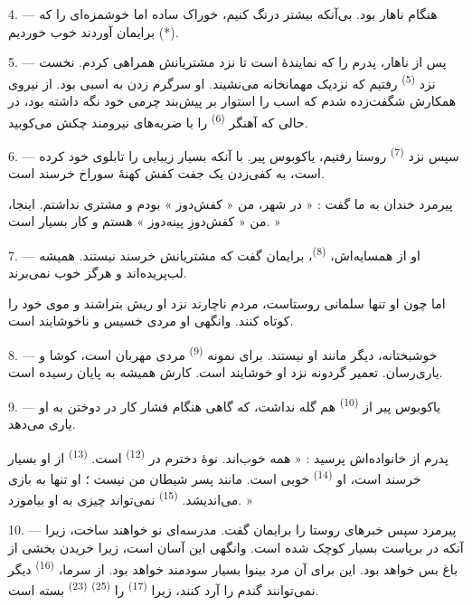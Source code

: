 4. --- هنگام ناهار بود. بی‌آنکه بیشتر درنگ کنیم، خوراک ساده اما
خوشمزه‌ای را که برایمان آوردند خوب خوردیم (*).

\VUsaut{3.0mm}
\VUsaut{3.0mm}

5. --- پس از ناهار، پدرم را که نمایندهٔ  است تا نزد
مشتریانش همراهی کردم. نخست نزد  \textsuperscript{(5)}
رفتیم که نزدیک مهمانخانه می‌نشیند. او سرگرم  زدن به اسبی
بود. از نیروی همکارش شگفت‌زده شدم که  اسب را استوار بر
پیش‌بند چرمی خود نگه داشته بود، در حالی که آهنگر 
\textsuperscript{(6)} را با ضربه‌های نیرومند چکش می‌کوبید.

6. --- سپس نزد  \textsuperscript{(7)} روستا رفتیم،
یاکوبوس پیر. با آنکه  بسیار زیبایی را تابلوی خود کرده
است، به کفی‌زدن یک جفت کفش کهنهٔ سوراخ خرسند است.

پیرمرد خندان به ما گفت : « در شهر، من « کفش‌دوز » بودم و مشتری
نداشتم. اینجا، من « کفش‌دوزِ پینه‌دوز » هستم و کار بسیار است. »

7. --- او از همسایه‌اش،  \textsuperscript{(8)}، برایمان
گفت که مشتریانش خرسند نیستند.  همیشه لب‌پریده‌اند و
 هرگز خوب نمی‌برند.

اما چون او تنها سلمانی روستاست، مردم ناچارند نزد او ریش بتراشند و
موی خود را کوتاه کنند. وانگهی او مردی خسیس و ناخوشایند است.

8. --- خوشبختانه،  دیگر مانند او نیستند. برای نمونه
 \textsuperscript{(9)} مردی مهربان است، کوشا و
یاری‌رسان. تعمیر گردونه نزد او خوشایند است. کارش همیشه به پایان رسیده
است.

9. --- یاکوبوس پیر از  \textsuperscript{(10)} هم گله
نداشت، که گاهی هنگام فشار کار در دوختن  به او یاری
می‌دهد.

پدرم از خانواده‌اش پرسید : « همه خوب‌اند. نوهٔ دخترم در
 \textsuperscript{(12)} است. 
\textsuperscript{(13)} از او بسیار خرسند است، او 
\textsuperscript{(14)} خوبی است. مانند پسر شیطان من نیست ؛ او تنها به
بازی می‌اندیشد.  \textsuperscript{(15)} نمی‌تواند چیزی
به او بیاموزد. »

\VUsaut{3.0mm}

10. --- پیرمرد سپس خبرهای روستا را برایمان گفت. مدرسه‌ای نو خواهند
ساخت، زیرا آنکه در  برپاست بسیار کوچک شده است. وانگهی
این آسان است، زیرا خریدن بخشی از باغ  بس خواهد بود.
این برای آن مرد بینوا بسیار سودمند خواهد بود. از سرما،
  \textsuperscript{(16)} دیگر
نمی‌توانند گندم را آرد کنند، زیرا  \textsuperscript{(17)}
را  \textsuperscript{(25)} 
\textsuperscript{(23)} بسته است.

